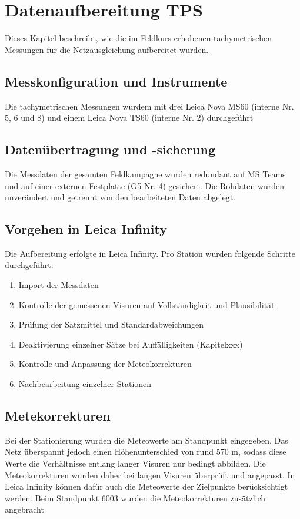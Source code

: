 \clearpage
\section{Datenaufbereitung TPS}
\label{sec:tps}
Dieses Kapitel beschreibt, wie die im Feldkurs erhobenen tachymetrischen Messungen
für die Netzausgleichung aufbereitet wurden.

\subsection{Messkonfiguration und Instrumente}
\label{sec:messkionfiguration und instrumente}
Die tachymetrischen Messungen wurdem mit drei Leica Nova MS60 (interne Nr. 5, 6 und 8)
und einem Leica Nova TS60 (interne Nr. 2) durchgeführt 

\subsection{Datenübertragung und -sicherung}
\label{sec:datenuebertragung und -sicherung}
Die Messdaten der gesamten Feldkampagne wurden redundant auf MS Teams und auf einer
externen Festplatte (G5 Nr. 4) gesichert. Die Rohdaten wurden unverändert und getrennt
von den bearbeiteten Daten abgelegt.

\subsection{Vorgehen in Leica Infinity}
\label{sec:vorgehen in leica infinity}
Die Aufbereitung erfolgte in Leica Infinity. Pro Station wurden folgende Schritte durchgeführt:
\begin{enumerate}
    \item Import der Messdaten
    \item Kontrolle der gemessenen Visuren auf Vollständigkeit und Plausibilität
    \item Prüfung der Satzmittel und Standardabweichungen
    \item Deaktivierung einzelner Sätze bei Auffälligkeiten (Kapitelxxx)
    \item Kontrolle und Anpassung der Meteokorrekturen
    \item Nachbearbeitung einzelner Stationen
\end{enumerate}

\subsection{Metekorrekturen}
\label{sec:metekorrekturen}
Bei der Stationierung wurden die Meteowerte am Standpunkt eingegeben. Das Netz
überspannt jedoch einen Höhenunterschied von rund 570 m, sodass diese Werte die
Verhältnisse entlang langer Visuren nur bedingt abbilden. Die Meteokorrekturen wurden
daher bei langen Visuren überprüft und angepasst. In Leica Infinity können dafür auch
die Meteowerte der Zielpunkte berücksichtigt werden. Beim Standpunkt 6003 wurden die
Meteokorrekturen zusätzlich angebracht

